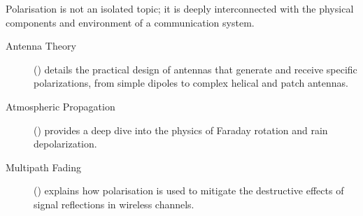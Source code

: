 \begin{importantbox}[title={Further Reading}]
    Polarisation is not an isolated topic; it is deeply interconnected with the physical components and environment of a communication system.
    \begin{description}
        \item[Antenna Theory] () details the practical design of antennas that generate and receive specific polarizations, from simple dipoles to complex helical and patch antennas.
        \item[Atmospheric Propagation] () provides a deep dive into the physics of Faraday rotation and rain depolarization.
        \item[Multipath Fading] () explains how polarisation is used to mitigate the destructive effects of signal reflections in wireless channels.
    \end{description}
\end{importantbox}
